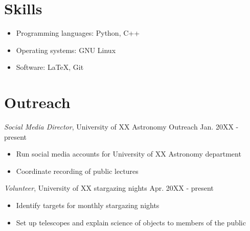 \documentclass[resmargin, 10pt]{res} %
\begin{document}
\begin{resume}
	\section{Skills}
	\begin{itemize} \itemsep -2pt
		\item Programming languages: Python, C++
		\item Operating systems: GNU Linux
		\item Software: LaTeX, Git


	\end{itemize}


	\section{Outreach}

	 {\sl Social Media Director}, University of XX Astronomy Outreach \hfill Jan. 20XX - present
	\vspace{1mm}
	\begin{itemize} \itemsep -2pt
		\item Run social media accounts for University of XX Astronomy department
		\item Coordinate recording of public lectures
	\end{itemize}

	{\sl Volunteer}, University of XX stargazing nights \hfill Apr. 20XX - present
	\vspace{1mm}
	\begin{itemize} \itemsep -2pt
		\item Identify targets for monthly stargazing nights
		\item Set up telescopes and explain science of objects to members of the public
	\end{itemize}


\end{resume}
\end{document}

